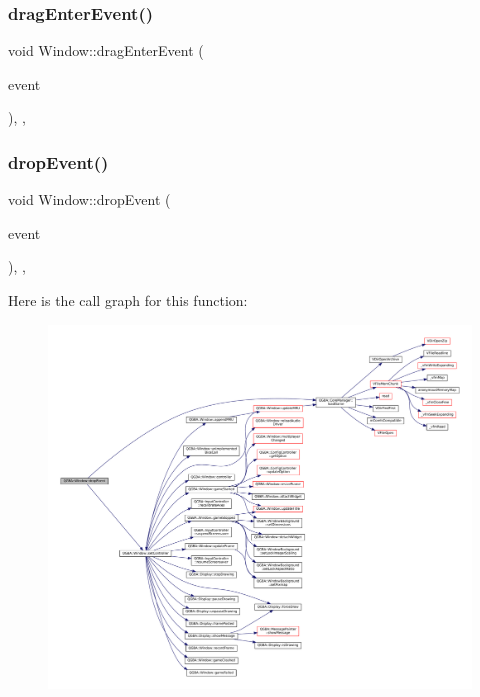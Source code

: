\subsubsection{\texorpdfstring{drag\+Enter\+Event()}{dragEnterEvent()}}
{\footnotesize\ttfamily void Window\+::drag\+Enter\+Event (\begin{DoxyParamCaption}\item[{Q\+Drag\+Enter\+Event $\ast$}]{event }\end{DoxyParamCaption})\hspace{0.3cm}{\ttfamily [override]}, {\ttfamily [protected]}, {\ttfamily [virtual]}}

\mbox{\label{class_q_g_b_a_1_1_window_a48f865692e88e6cc9cf738f69597866f}} 
\subsubsection{\texorpdfstring{drop\+Event()}{dropEvent()}}
{\footnotesize\ttfamily void Window\+::drop\+Event (\begin{DoxyParamCaption}\item[{Q\+Drop\+Event $\ast$}]{event }\end{DoxyParamCaption})\hspace{0.3cm}{\ttfamily [override]}, {\ttfamily [protected]}, {\ttfamily [virtual]}}

Here is the call graph for this function\+:
\nopagebreak
\begin{figure}[H]
\begin{center}
\leavevmode
\includegraphics[width=350pt]{class_q_g_b_a_1_1_window_a48f865692e88e6cc9cf738f69597866f_cgraph}
\end{center}
\end{figure}
\mbox{\label{class_q_g_b_a_1_1_window_a92ffce5aac01967b0faaa5eb0885726e}} 
